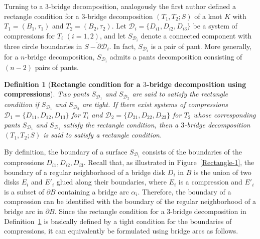 \documentclass[12pt]{amsart}
\newtheorem{Def}[theorem]{Definition}
\begin{document}
Turning to a 3-bridge decomposition, analogously the first author \cite{K20} defined a rectangle condition for a $3$-bridge decomposition $(T_1, T_2;S)$ of a knot $K$ with $T_1=(B_1, \tau_1)$ and $T_2=(B_2, \tau_2)$.
Let $\mathcal{D}_i=\{D_{i1}, D_{i2}, D_{i3}\}$ be a system of compressions for $T_i$ $(i=1,2)$, and let $S_{\mathcal{D}_i}$ denote a connected component with
three circle boundaries in $\overline{S- \partial \mathcal{D}_i}$. In fact, $S_{\mathcal{D}_i}$ is a pair of pant. More generally, for a $n$-bridge decomposition, $S_{\mathcal{D}_i}$ admits a pants decomposition consisting of $(n-2)$ pairs of pants.

\begin{Def}
[\textbf{Rectangle condition for a $3$-bridge decomposition using compressions}] \label{for a 3-bridge decomposition using compressions}
Two pants $S_{\mathcal{D}_1}$ and $S_{\mathcal{D}_2}$ are said to satisfy the rectangle condition if $S_{\mathcal{D}_1}$ and $S_{\mathcal{D}_2}$ are tight.
If there exist systems of compressions $\mathcal{D}_1=\{D_{11}, D_{12}, D_{13}\}$ for $T_i$ and $\mathcal{D}_2=\{D_{21}, D_{22}, D_{23}\}$ for $T_2$
whose corresponding pants $S_{\mathcal{D}_1}$ and $S_{\mathcal{D}_1}$ satisfy the rectangle condition, then a $3$-bridge decomposition $(T_1,T_2;S)$ is said to satisfy a rectangle condition.
\end{Def}


By definition, the boundary of a surface $S_{\mathcal{D}_i}$ consists of the boundaries of the compressions $D_{i1}, D_{i2}, D_{i3}$.
Recall that, as illustrated in Figure~\ref{Rectangle-1}, the boundary of a regular neighborhood of a bridge disk $D_i$ in $B$ is the union
of two disks $E_i$ and $E'_i$ glued along their boundaries, where $E_i$ is a compression and $E'_i$ is a subset of $\partial B$ containing a bridge arc $\alpha_i$.
Therefore, the boundary of a compression can be identified with the boundary of the regular neighborhood of a bridge arc in $\partial B$.
Since the rectangle condition for a $3$-bridge decomposition in Definition~\ref{for a 3-bridge decomposition using compressions} is basically defined by a tight condition for the boundaries of compressions, it can equivalently be formulated using bridge arcs as follows.
\end{document}
